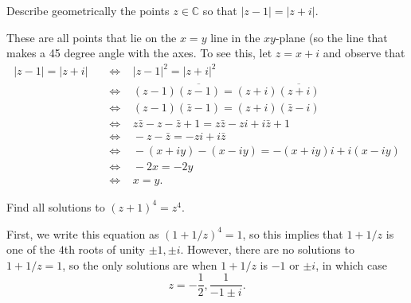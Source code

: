 \documentclass[11pt,dvipsnames]{book}
\numberwithin{equation}{section} %
\numberwithin{figure}{section} %
\numberwithin{table}{section} %
\begin{document}
\begin{exercise} Describe geometrically the points $z\in\mathbb{C}$ so that $|z-1|=|z+i|$. 


\begin{solution}
These are all points that lie on the $x=y$ line in the $xy$-plane (so the line that makes a 45 degree angle with the axes. To see this, let $z=x+i$ and observe that 
\begin{align*}
|z-1|=|z+i| & \;\;\; \Longleftrightarrow \;\;\; |z-1|^2=|z+i|^2\\
& \;\;\; \Longleftrightarrow \;\;\; (z-1)\overline{(z-1)} = (z+i)\overline{(z+i)} \\
& \;\;\; \Longleftrightarrow \;\;\;  (z-1)(\bar{z}-1)=(z+i)(\bar{z}-i) \\
& \;\;\; \Longleftrightarrow \;\;\; z\bar{z}-z-\bar{z}+1 = z\bar{z} -zi+i\bar{z}+1\\
& \;\;\; \Longleftrightarrow \;\;\;  -z-\bar{z}= -zi+i\bar{z}\\
& \;\;\; \Longleftrightarrow \;\;\;  -(x+iy)-(x-iy) = -(x+iy)i+i(x-iy) \\
& \;\;\; \Longleftrightarrow \;\;\;  -2x = -2y\\
& \;\;\; \Longleftrightarrow \;\;\;  x=y.
\end{align*}
\end{solution}
\end{exercise}




\begin{exercise} Find all solutions to $(z+1)^4=z^4$. 

\begin{solution}
First, we write this equation as $(1+1/z)^4=1$, so this implies that $1+1/z$ is one of the $4$th roots of unity $\pm1,\pm i$. However, there are no solutions to $1+1/z=1$, so the only solutions are when $1+1/z$ is $-1$ or $\pm i$, in which case 
\[
z=-\frac{1}{2}, \frac{1}{-1\pm i}.
\]
\end{solution}


\end{exercise}
\end{document}
